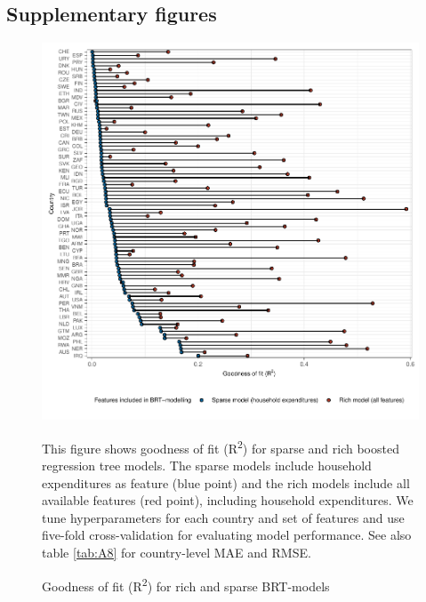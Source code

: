 \documentclass[12pt, a4paper]{article}
\newenvironment{subcaption2}
{\strut
\vspace{-5pt}
\begin{minipage}[b]{0.95\textwidth}
  \hspace*{-\parindent}
  \footnotesize}
 {\end{minipage}}
\begin{document}
\begin{refsection}
\section{Supplementary figures} \label{sec:figures}





\clearpage


\clearpage


\clearpage


\clearpage

\begin{figure}[ht!]
    \centering
    \includegraphics[width=\textwidth]{1_Figures/Figures_Appendix/Figure_Comparison_Models.pdf}
    \caption{Goodness of fit (R\textsuperscript{2}) for rich and sparse BRT-models}\label{fig:comparison}
    \label{fig:comparison_models}
    \begin{subcaption2}
    This figure shows goodness of fit (R\textsuperscript{2}) for sparse and rich boosted regression tree models. The sparse models include household expenditures as feature (blue point) and the rich models include all available features (red point), including household expenditures. We tune hyperparameters for each country and set of features and use five-fold cross-validation for evaluating model performance. See also table \ref{tab:A8} for country-level MAE and RMSE.
    \end{subcaption2}
\end{figure}


\end{refsection}
\end{document}
